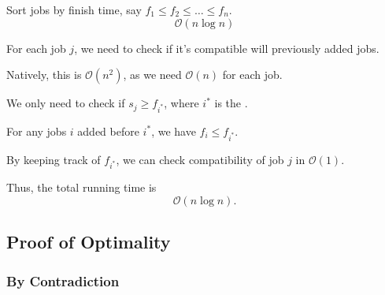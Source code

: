 \begin{listu}
    \item Sort jobs by finish time, say $f_1 \le f_2 \le \dots \le f_n$. \[
        \mathcal{O}(n \log n)
    \]

    \item For each job $j$, we need to check if it's compatible will  previously added jobs.

    \begin{listu}
        \item Natively, this is $\mathcal{O}(n^2)$, as we need $\mathcal{O}(n)$ for each job.
        \item We only need to check if $s_j \ge f_{i^*}$, where $i^*$ is the .
        \begin{listu}
            \item For any jobs $i$ added before $i^*$, we have $f_i \le f_{i^*}$.
            \item By keeping track of $f_{i^*}$, we can check compatibility of job $j$ in $\mathcal{O}(1)$.
        \end{listu}
    \end{listu}

    \item Thus, the total running time is \[
        \mathcal{O}(n \log n).
    \]
\end{listu}

\subsection{Proof of Optimality}

\subsubsection{By Contradiction}

